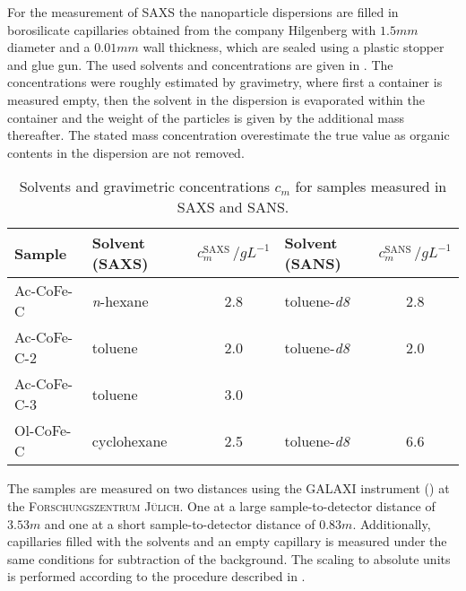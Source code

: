 \documentclass[\main/dresen_thesis.tex]{subfiles}
\begin{document}
    For the measurement of SAXS the nanoparticle dispersions are filled in borosilicate capillaries obtained from the company Hilgenberg with $1.5 \unit{mm}$ diameter and a $0.01 \unit{mm}$ wall thickness, which are sealed using a plastic stopper and glue gun.
    The used solvents and concentrations are given in .
    The concentrations were roughly estimated by gravimetry, where first a container is measured empty, then the solvent in the dispersion is evaporated within the container and the weight of the particles is given by the additional mass thereafter.
    The stated mass concentration overestimate the true value as organic contents in the dispersion are not removed.
    \begin{table}[!htbp]
      \centering
      \caption{\label{tab:monolayers:charMethod:sampleConcentrations}Solvents and gravimetric concentrations $c_m$ for samples measured in SAXS and SANS.}
      \begin{tabular}{ l | l | c | l | c }
        \textbf{Sample}  & Solvent (SAXS) & $c_m^\mathrm{SAXS} \,/ \unit{gL^{-1}}$ & Solvent (SANS) & $c_m^\mathrm{SANS}\,/ \unit{gL^{-1}}$\\
        \hline
        Ac-CoFe-C   & \textit{n}-hexane & 2.8                 & toluene-\textit{d8}       & 2.8\\
        Ac-CoFe-C-2 & toluene             & 2.0                 & toluene-\textit{d8}       & 2.0\\
        Ac-CoFe-C-3 & toluene             & 3.0                 &                  & \\
        Ol-CoFe-C   & cyclohexane         & 2.5                 & toluene-\textit{d8}       & 6.6\\
        \hline
      \end{tabular}
    \end{table}

    The samples are measured on two distances using the GALAXI instrument () at the \textsc{Forschungszentrum J\"ulich}.
    One at a large sample-to-detector distance of $3.53 \unit{m}$ and one at a short sample-to-detector distance of $0.83 \unit{m}$.
    Additionally, capillaries filled with the solvents and an empty capillary is measured under the same conditions for subtraction of the background.
    The scaling to absolute units is performed according to the procedure described in .
\end{document}
